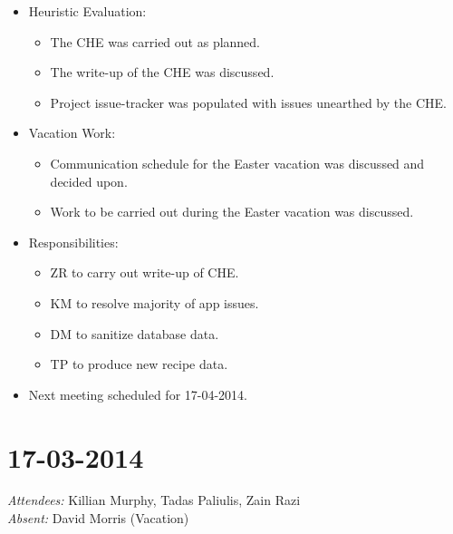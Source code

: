 \documentclass{article}
\begin{document}
\begin{itemize}
\item Heuristic Evaluation:
  \begin{itemize}
  \item The CHE was carried out as planned.
  \item The write-up of the CHE was discussed.
  \item Project issue-tracker was populated with issues unearthed by the CHE.
  \end{itemize}
\item Vacation Work:
  \begin{itemize}
  \item Communication schedule for the Easter vacation was discussed and decided upon.
  \item Work to be carried out during the Easter vacation was discussed.
  \end{itemize}
\item Responsibilities:
  \begin{itemize}
  \item ZR to carry out write-up of CHE.
  \item KM to resolve majority of app issues.
  \item DM to sanitize database data.
  \item TP to produce new recipe data.
  \end{itemize}
\item Next meeting scheduled for 17-04-2014.
\end{itemize}

\clearpage

\section*{17-03-2014}
\vspace{0.5cm}
\emph{Attendees: }Killian Murphy, Tadas Paliulis, Zain Razi
\\
\emph{Absent: }David Morris (Vacation)
\end{document}
